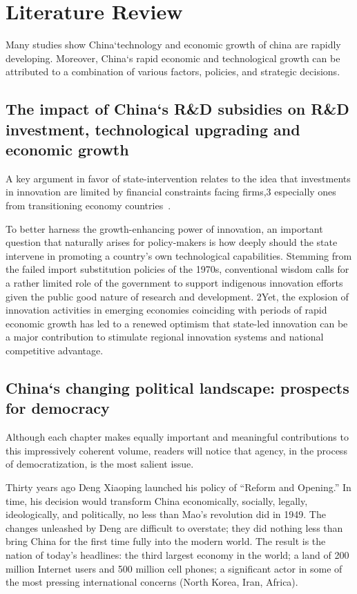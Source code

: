 \chapter{Literature Review}

Many studies show China`technology and economic growth of 
china are rapidly developing. Moreover, China`s rapid economic 
and technological growth can be attributed to a combination of 
various factors, policies, and strategic decisions. 

\section{The impact of China`s R\&D subsidies on R\&D investment, technological upgrading and economic growth}

A key argument in favor of state-intervention relates to the idea that 
investments in innovation are limited by financial constraints facing 
firms,3 especially ones from transitioning economy countries~\cite{BOEING2022121212}.

To better harness the growth-enhancing power of innovation, an 
important question that naturally arises for policy-makers is 
how deeply should the state intervene in promoting a country's 
own technological capabilities. Stemming from the failed import 
substitution policies of the 1970s, conventional wisdom calls for 
a rather limited role of the government to support indigenous 
innovation efforts given the public good nature of research and 
development. 2Yet, the explosion of innovation activities in 
emerging economies coinciding with periods of rapid economic 
growth has led to a renewed optimism that state-led innovation 
can be a major contribution to stimulate regional innovation 
systems and national competitive advantage.

\section{China`s changing political landscape: prospects for democracy}

Although each chapter makes equally important and meaningful 
contributions to this impressively coherent volume, readers 
will notice that agency, in the process of democratization, 
is the most salient issue.

Thirty years ago Deng Xiaoping launched his policy of 
“Reform and Opening.” In time, his decision would transform China 
economically, socially, legally, ideologically, and politically, 
no less than Mao's revolution did in 1949. The changes unleashed 
by Deng are difficult to overstate; they did nothing less than 
bring China for the first time fully into the modern world. The 
result is the nation of today's headlines: the third largest 
economy in the world; a land of 200 million Internet users and 
500 million cell phones; a significant actor in some of the most 
pressing international concerns (North Korea, Iran, Africa).

